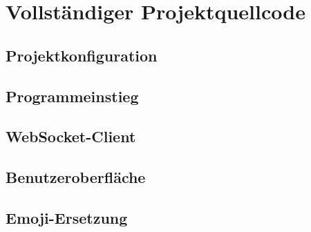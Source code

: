 \section{Vollständiger Projektquellcode}
\lstlistoflistings

\subsection{Projektkonfiguration}



\clearpage
\subsection{Programmeinstieg}


\subsection{WebSocket-Client}



\clearpage
\subsection{Benutzeroberfläche}




\clearpage
\subsection{Emoji-Ersetzung}


